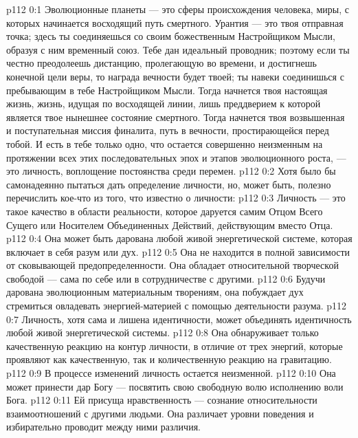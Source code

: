 \author{Одиночный Вестник}
\vs p112 0:1 Эволюционные планеты --- это сферы происхождения человека, миры, с которых начинается восходящий путь смертного. Урантия --- это твоя отправная точка; здесь ты соединяешься со своим божественным Настройщиком Мысли, образуя с ним временный союз. Тебе дан идеальный проводник; поэтому если ты честно преодолеешь дистанцию, пролегающую во времени, и достигнешь конечной цели веры, то награда вечности будет твоей; ты навеки соединишься с пребывающим в тебе Настройщиком Мысли. Тогда начнется твоя настоящая жизнь, жизнь, идущая по восходящей линии, лишь преддверием к которой является твое нынешнее состояние смертного. Тогда начнется твоя возвышенная и поступательная миссия финалита, путь в вечности, простирающейся перед тобой. И есть в тебе только одно, что остается совершенно неизменным на протяжении всех этих последовательных эпох и этапов эволюционного роста, --- это личность, воплощение постоянства среди перемен.
\vs p112 0:2 \pc Хотя было бы самонадеянно пытаться дать определение личности, но, может быть, полезно перечислить кое\hyp{}что из того, что известно о личности:
\vs p112 0:3 \bibnobreakspace Личность --- это такое качество в области реальности, которое даруется самим Отцом Всего Сущего или Носителем Объединенных Действий, действующим вместо Отца.
\vs p112 0:4 \bibnobreakspace Она может быть дарована любой живой энергетической системе, которая включает в себя разум или дух.
\vs p112 0:5 \bibnobreakspace Она не находится в полной зависимости от сковывающей предопределенности. Она обладает относительной творческой свободой --- сама по себе или в сотрудничестве с другими.
\vs p112 0:6 \bibnobreakspace Будучи дарована эволюционным материальным творениям, она побуждает дух стремиться овладевать энергией\hyp{}материей с помощью деятельности разума.
\vs p112 0:7 \bibnobreakspace Личность, хотя сама и лишена идентичности, может объединять идентичность любой живой энергетической системы.
\vs p112 0:8 \bibnobreakspace Она обнаруживает только качественную реакцию на контур личности, в отличие от трех энергий, которые проявляют как качественную, так и количественную реакцию на гравитацию.
\vs p112 0:9 \bibnobreakspace В процессе изменений личность остается неизменной.
\vs p112 0:10 \bibnobreakspace Она может принести дар Богу --- посвятить свою свободную волю исполнению воли Бога.
\vs p112 0:11 \bibnobreakspace Ей присуща нравственность --- сознание относительности взаимоотношений с другими людьми. Она различает уровни поведения и избирательно проводит между ними различия.
